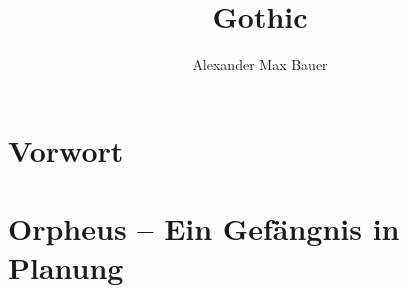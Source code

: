 \documentclass[12pt]{scrbook}
\title{Gothic}
\subtitle{}
\author{Alexander Max Bauer}
\date{}
\begin{document}
\maketitle


\frontmatter
\tableofcontents


\chapter{Vorwort}


\mainmatter
\chapter{Orpheus – Ein Gefängnis in Planung}


\clearpage
\appendix


\clearpage
\printbibliography
\end{document}
